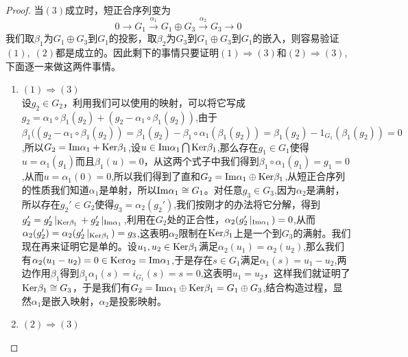 \begin{proof}
当$(3)$成立时，短正合序列变为
\begin{equation*}
    0 \rightarrow G_{1}\xrightarrow{\alpha_{1}}G_{1}\oplus G_{3}\xrightarrow{\alpha_{2}}G_{3}\rightarrow 0
\end{equation*}
我们取$\beta_{1}$为$G_{1}\oplus G_{3}$到$G_{1}$的投影，取$\beta_{2}$为$G_{3}$到$G_{1}\oplus G_{3}$到$G_{1}$的嵌入，则容易验证$(1),\;(2)$都是成立的。因此剩下的事情只要证明$(1)\Rightarrow(3)$和$(2)\Rightarrow (3)$,下面逐一来做这两件事情。
\begin{enumerate}
    \item $(1)\Rightarrow (3)$ \\
    设$g_{2}\in G_{2}$，利用我们可以使用的映射，可以将它写成$g_{2}=\alpha_{1}\circ\beta_{1}(g_{2})+(g_{2}-\alpha_{1}\circ\beta_{1}(g_{2}))$,由于$\beta_{1}((g_{2}-\alpha_{1}\circ\beta_{1}(g_{2}))=\beta_{1}(g_{2})-\beta_{1}\circ\alpha_{1}(\beta_{1}(g_{2}))=\beta_{1}(g_{2})-1_{G_{1}}(\beta_{1}(g_{2}))=0$,所以$G_{2}={\rm Im}\alpha_{1}+{\rm Ker}\beta_{1}$,设$u\in{\rm Im}\alpha_{1}\bigcap{\rm Ker}\beta_{1}$,那么存在$g_{1}\in G_{1}$使得$u=\alpha_{1}(g_{1})$而且$\beta_{1}(u)=0$，从这两个式子中我们得到$\beta_{1}\circ\alpha_{1}(g_{1})=g_{1}=0$,从而$u=\alpha_{1}(0)=0$,所以我们得到了直和$G_{2}={\rm Im}\alpha_{1}\oplus{\rm Ker}\beta_{1}$,从短正合序列的性质我们知道$\alpha_{1}$是单射，所以${\rm Im}\alpha_{1}\cong G_{1}$。对任意$g_{3}\in G_{3}$,因为$\alpha_{2}$是满射，所以存在$g_{2}'\in G_{2}$使得$g_{3}=\alpha_{2}(g_{2}')$,我们按刚才的办法将它分解，得到$g_{2}'=g_{2}'\left|_{{\rm Ker}\beta_{1}}\right.+g_{2}'\left|_{{\rm Im}\alpha_{1}}\right.$,利用在$G_{2}$处的正合性，$\alpha_{2}(g_{2}'\left|_{{\rm Im}\alpha_{1}}\right.)=0$,从而$\alpha_{2}(g_{2}')=\alpha_{2}(g_{2}'\left|_{{\rm Ker}\beta_{1}}\right.)=g_{3}$,这表明$\alpha_{2}$限制在${\rm Ker}\beta_{1}$上是一个到$G_{3}$的满射。我们现在再来证明它是单的。设$u_{1},u_{2}\in {\rm Ker}\beta_{1}$满足$\alpha_{2}(u_{1})=\alpha_{2}(u_{2})$,那么我们有$\alpha_{2}(u_{1}-u_{2})=0\in{\rm Ker}\alpha_{2}={\rm Im}\alpha_{1}$,于是存在$s\in G_{1}$满足$\alpha_{1}(s)=u_{1}-u_{2}$,两边作用$\beta_{1}$得到$\beta_{1}\alpha_{1}(s)=i_{G_{1}}(s)=s=0$,这表明$u_{1}=u_{2}$，这样我们就证明了${\rm Ker}\beta_{1}\cong G_{3}$，于是我们有$G_{2}={\rm Im} \alpha_{1}\oplus {\rm Ker}\beta_{1}=G_{1}\oplus G_{3}$,结合构造过程，显然$\alpha_{1}$是嵌入映射，$\alpha_{2}$是投影映射。
    \item $(2)\Rightarrow (3)$ \\

\end{enumerate}
\end{proof}
